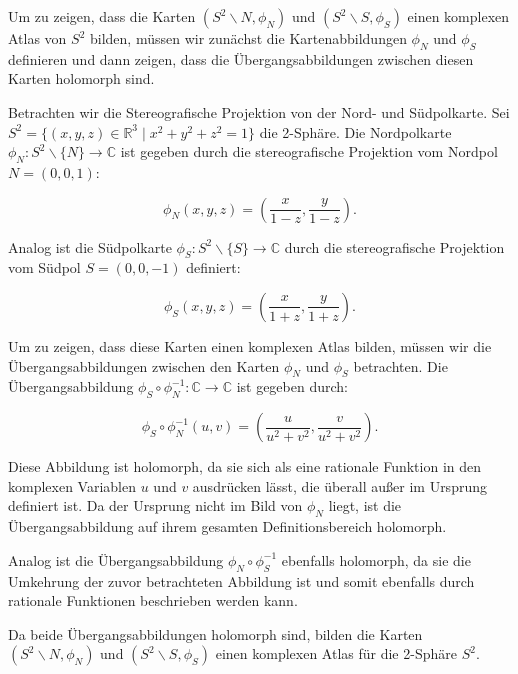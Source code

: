 Um zu zeigen, dass die Karten $\left(S^2 \backslash N, \phi_N\right)$ und $\left(S^2 \backslash S, \phi_S\right)$ einen komplexen Atlas von $S^2$ bilden, müssen wir zunächst die Kartenabbildungen $\phi_N$ und $\phi_S$ definieren und dann zeigen, dass die Übergangsabbildungen zwischen diesen Karten holomorph sind.

Betrachten wir die Stereografische Projektion von der Nord- und Südpolkarte. Sei $S^2 = \{ (x, y, z) \in \mathbb{R}^3 \mid x^2 + y^2 + z^2 = 1 \}$ die 2-Sphäre. Die Nordpolkarte $\phi_N: S^2 \backslash \{N\} \to \mathbb{C}$ ist gegeben durch die stereografische Projektion vom Nordpol $N = (0, 0, 1)$:

\[
\phi_N(x, y, z) = \left( \frac{x}{1 - z}, \frac{y}{1 - z} \right).
\]

Analog ist die Südpolkarte $\phi_S: S^2 \backslash \{S\} \to \mathbb{C}$ durch die stereografische Projektion vom Südpol $S = (0, 0, -1)$ definiert:

\[
\phi_S(x, y, z) = \left( \frac{x}{1 + z}, \frac{y}{1 + z} \right).
\]

Um zu zeigen, dass diese Karten einen komplexen Atlas bilden, müssen wir die Übergangsabbildungen zwischen den Karten $\phi_N$ und $\phi_S$ betrachten. Die Übergangsabbildung $\phi_S \circ \phi_N^{-1}: \mathbb{C} \to \mathbb{C}$ ist gegeben durch:

\[
\phi_S \circ \phi_N^{-1}(u, v) = \left( \frac{u}{u^2 + v^2}, \frac{v}{u^2 + v^2} \right).
\]

Diese Abbildung ist holomorph, da sie sich als eine rationale Funktion in den komplexen Variablen $u$ und $v$ ausdrücken lässt, die überall außer im Ursprung definiert ist. Da der Ursprung nicht im Bild von $\phi_N$ liegt, ist die Übergangsabbildung auf ihrem gesamten Definitionsbereich holomorph.

Analog ist die Übergangsabbildung $\phi_N \circ \phi_S^{-1}$ ebenfalls holomorph, da sie die Umkehrung der zuvor betrachteten Abbildung ist und somit ebenfalls durch rationale Funktionen beschrieben werden kann.

Da beide Übergangsabbildungen holomorph sind, bilden die Karten $\left(S^2 \backslash N, \phi_N\right)$ und $\left(S^2 \backslash S, \phi_S\right)$ einen komplexen Atlas für die 2-Sphäre $S^2$.